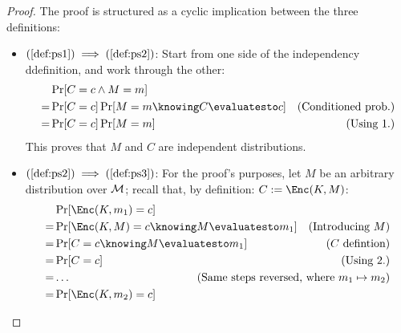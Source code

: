 \begin{proof}
    The proof is structured as a cyclic implication between the three definitions:
    
    \begin{itemize}
        \item $(\ref{def:ps1}) \implies (\ref{def:ps2})$: Start from one side of the independency ddefinition, and work through the other:
        \begin{align*}
            & \Pr[C = c \wedge M = m]                           & \\
            =& \Pr[C = c] \Pr[M = m \knowing C \evaluatesto c]  & \text{(Conditioned prob.)} \\
            =& \Pr[C = c] \Pr[M = m]                            & \text{(Using 1.)} \\
        \end{align*}
        This proves that $M$ and $C$ are independent distributions.
        
        \item $(\ref{def:ps2}) \implies (\ref{def:ps3})$: For the proof's purposes, let $M$ be an arbitrary distribution over $\mathcal{M}$; recall that, by definition: $C := \Enc(K, M)$:
        \begin{align*}
            & \Pr[\Enc(K, m_1) = c]                             & \\
            =& \Pr[\Enc(K, M) = c \knowing M \evaluatesto m_1]  & \text{(Introducing $M$)} \\
            =& \Pr[C = c \knowing M \evaluatesto m_1]           & \text{($C$ defintion)} \\
            =& \Pr[C = c]                                       & \text{(Using 2.)} \\
            =& \dots                                            & \mathllap{\text{(Same steps reversed, where $m_1 \mapsto m_2$)}} \\
            =& \Pr[\Enc(K, m_2) = c]                            & \\
        \end{align*}



\end{itemize}
\end{proof}
